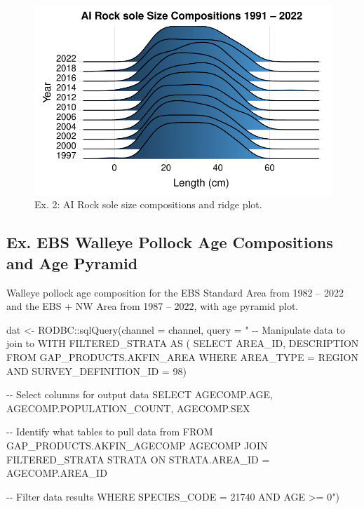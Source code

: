 \documentclass[
  letterpaper,
  oneside,
  open=any]{scrbook}
\newenvironment{Shaded}{\begin{snugshade}}{\end{snugshade}}
\newcommand{\AttributeTok}[1]{\textcolor[rgb]{0.40,0.45,0.13}{#1}}
\newcommand{\FunctionTok}[1]{\textcolor[rgb]{0.28,0.35,0.67}{#1}}
\newcommand{\NormalTok}[1]{\textcolor[rgb]{0.00,0.23,0.31}{#1}}
\newcommand{\OtherTok}[1]{\textcolor[rgb]{0.00,0.23,0.31}{#1}}
\newcommand{\SpecialCharTok}[1]{\textcolor[rgb]{0.37,0.37,0.37}{#1}}
\newcommand{\StringTok}[1]{\textcolor[rgb]{0.13,0.47,0.30}{#1}}
\begin{document}
\begin{figure}[H]

{\centering \includegraphics{content/akfin-oracle-sql-r_files/figure-pdf/test-2-plot-1.pdf}

}

\caption{Ex. 2: AI Rock sole size compositions and ridge plot.}

\end{figure}

\hypertarget{ex.-ebs-walleye-pollock-age-compositions-and-age-pyramid}{%
\subsection{Ex. EBS Walleye Pollock Age Compositions and Age
Pyramid}\label{ex.-ebs-walleye-pollock-age-compositions-and-age-pyramid}}

Walleye pollock age composition for the EBS Standard Area from 1982 --
2022 and the EBS + NW Area from 1987 -- 2022, with age pyramid plot.

\begin{Shaded}
\begin{Highlighting}[]
\NormalTok{dat }\OtherTok{\textless{}{-}}\NormalTok{ RODBC}\SpecialCharTok{::}\FunctionTok{sqlQuery}\NormalTok{(}\AttributeTok{channel =}\NormalTok{ channel, }
                       \AttributeTok{query =} 
                         \StringTok{"}
\StringTok{{-}{-} Manipulate data to join to}
\StringTok{WITH FILTERED\_STRATA AS (}
\StringTok{SELECT }
\StringTok{AREA\_ID, }
\StringTok{DESCRIPTION }
\StringTok{FROM GAP\_PRODUCTS.AKFIN\_AREA}
\StringTok{WHERE AREA\_TYPE = \textquotesingle{}REGION\textquotesingle{} AND }
\StringTok{SURVEY\_DEFINITION\_ID = 98)}

\StringTok{{-}{-} Select columns for output data}
\StringTok{SELECT }
\StringTok{AGECOMP.AGE, }
\StringTok{AGECOMP.POPULATION\_COUNT, }
\StringTok{AGECOMP.SEX}

\StringTok{{-}{-} Identify what tables to pull data from}
\StringTok{FROM GAP\_PRODUCTS.AKFIN\_AGECOMP AGECOMP}
\StringTok{JOIN FILTERED\_STRATA STRATA }
\StringTok{ON STRATA.AREA\_ID = AGECOMP.AREA\_ID}

\StringTok{{-}{-} Filter data results}
\StringTok{WHERE SPECIES\_CODE = 21740}
\StringTok{AND AGE \textgreater{}= 0"}\NormalTok{)}
\end{Highlighting}
\end{Shaded}
\end{document}
